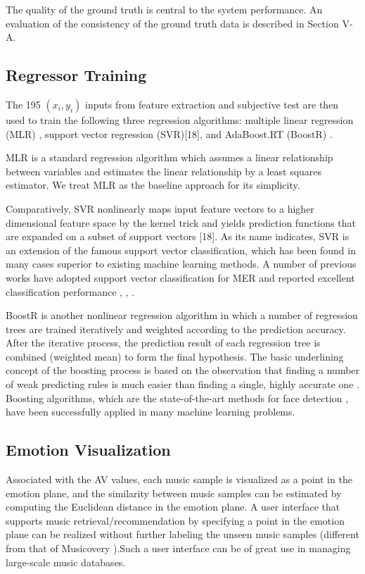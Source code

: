 \documentclass[journal, twoside]{IEEEtran}
\begin{document}
The quality of the ground truth is central to the system performance. An evaluation of the consistency of the ground truth
data is described in Section V-A.

\subsection{Regressor Training}
The 195 \((x_i,y_i)\) inputs from feature extraction and subjective test are then used to train the following three regression algorithms: multiple linear regression (MLR) \cite{17}, support vector regression (SVR)[18], and AdaBoost.RT (BoostR) \cite{20}.

MLR is a standard regression algorithm which assumes a linear relationship between variables and estimates the linear relationship by a least squares estimator. We treat MLR as the baseline approach for its simplicity.

Comparatively, SVR nonlinearly maps input feature vectors to a higher dimensional feature space by the kernel trick and yields prediction functions that are expanded on a subset of support vectors [18]. As its name indicates, SVR is an extension of the famous support vector classification, which has been found in many cases superior to existing machine learning methods. A number of previous works have adopted support vector classification for MER and reported excellent classification performance \cite{9}, \cite{4}, \cite{6}.

BoostR is another nonlinear regression algorithm in which a number of regression trees are trained iteratively and weighted according to the prediction accuracy. After the iterative process, the prediction result of each regression tree is combined (weighted mean) to form the final hypothesis. The basic underlining concept of the boosting process is based on the observation that finding a number of weak predicting rules is much easier than finding a single, highly accurate one \cite{20}. Boosting algorithms, which are the state-of-the-art methods for face detection \cite{21}, have been successfully applied in many
machine learning problems.

\subsection{Emotion Visualization}
Associated with the AV values, each music sample is visualized as a point in the emotion plane, and the similarity between music samples can be estimated by computing the Euclidean distance in the emotion plane. A user interface that supports music retrieval/recommendation by specifying a point in the emotion plane can be realized without further labeling the unseen music samples (different from that of Musicovery \cite{31}).Such a user interface can be of great use in managing large-scale music databases.
\end{document}
